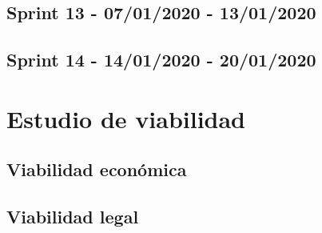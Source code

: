 \subsection{Sprint 13 - 07/01/2020 - 13/01/2020}

\subsection{Sprint 14 - 14/01/2020 - 20/01/2020}




\section{Estudio de viabilidad}

\subsection{Viabilidad económica}

\subsection{Viabilidad legal}


